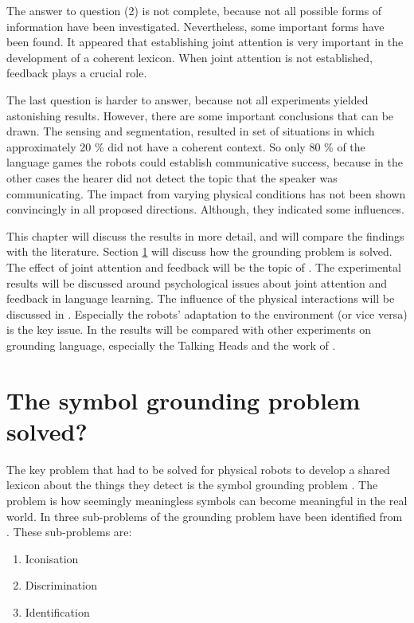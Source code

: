 The answer to question (2) is not complete, because not all possible forms of information have been investigated. Nevertheless, some important forms have been found. It appeared that establishing joint attention is very important in the development of a coherent lexicon. When joint attention is not established, feedback plays a crucial role.

The last question is harder to answer, because not all experiments yielded astonishing results. However, there are some important conclusions that can be drawn. The sensing and segmentation, resulted in set of situations in which approximately 20 \% did not have a coherent context. So only 80 \% of the language games the robots could establish communicative success, because in the other cases the hearer did not detect the topic that the speaker was communicating. The impact from varying physical conditions has not been shown convincingly in all proposed directions. Although, they indicated some influences.


This chapter will discuss the results in more detail, and will compare the findings with the literature. Section \ref{s:disc:global} will discuss how the grounding problem is solved. The effect of joint attention and feedback will be the topic of . The experimental results will be discussed around psychological issues about joint attention and feedback in language learning. The influence of the physical interactions will be discussed in . Especially the robots' adaptation to the environment (or vice versa) is the key issue. In  the results will be compared with other experiments on grounding language, especially the Talking Heads \citep{belpaeme:1998} and the work of \citet{billard:1997a}.

\section{The symbol grounding problem solved?}\label{s:disc:global}

The key problem that had to be solved for physical robots to develop a shared lexicon about the things they detect is the symbol grounding problem \citep{harnad:1990}. The problem is how seemingly meaningless symbols can become meaningful in the real world. In  three sub-problems of the grounding problem have been identified from \citep{harnad:1990}. These sub-problems are:

\begin{enumerate}
\item Iconisation
\item Discrimination
\item Identification
\end{enumerate}

